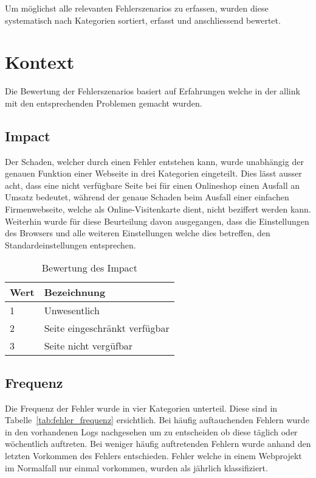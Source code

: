 
Um möglichst alle relevanten Fehlerszenarios zu erfassen, wurden diese systematisch nach Kategorien sortiert, erfasst und anschliessend bewertet.

\section{Kontext}
\label{sec:kontext}
Die Bewertung der Fehlerszenarios basiert auf Erfahrungen welche in der allink mit den entsprechenden Problemen gemacht wurden.

\makeatletter
{} \setcounter{fnumber}{0}
\renewcommand\thefnumber{F\arabic{fnumber}}
\newcommand{\newfnumber}[5]%
{%
\midrule%
\refstepcounter{fnumber}%
\expandafter\xdef\csname f#2\endcsname {#1}%
\thefnumber\label{f:#2} & #1 & #3 & #4 & #5 \\
}
\makeatother

\subsection{Impact}
\label{sub:impact}
Der Schaden, welcher durch einen Fehler entstehen kann, wurde unabhängig der genauen Funktion einer Webseite in drei Kategorien eingeteilt. Dies lässt ausser acht, dass eine nicht verfügbare Seite bei für einen Onlineshop einen Ausfall an Umsatz bedeutet, während der genaue Schaden beim Ausfall einer einfachen Firmenwebseite, welche als Online-Visitenkarte dient, nicht beziffert werden kann. Weiterhin wurde für diese Beurteilung davon ausgegangen, dass die Einstellungen des Browsers und alle weiteren Einstellungen welche dies betreffen, den Standardeinstellungen entsprechen.

\begin{table}[h!]
  \centering
  \begin{tabular}{ll}
  \toprule
    Wert & Bezeichnung\\
  \hline
    1 & Unwesentlich\\
  \hline
    2 & Seite eingeschränkt verfügbar\\
  \hline
    3 & Seite nicht vergüfbar\\
  \bottomrule
  \end{tabular}
  \caption{Bewertung des Impact}
  \label{tab:impact}
\end{table}

\subsection{Frequenz}
\label{sub:frequenz}
Die Frequenz der Fehler wurde in vier Kategorien unterteil. Diese sind in Tabelle~\ref{tab:fehler_frequenz} ersichtlich. Bei häufig auftauchenden Fehlern wurde in den vorhandenen Logs nachgesehen um zu entscheiden ob diese täglich oder wöchentlich auftreten. Bei weniger häufig auftretenden Fehlern wurde anhand den letzten Vorkommen des Fehlers entschieden. Fehler welche in einem Webprojekt im Normalfall nur einmal vorkommen, wurden als jährlich klassifiziert.

